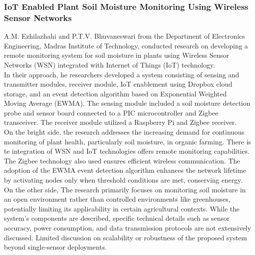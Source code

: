 \documentclass[12pt, a4paper]{article}
\begin{document}
\subsubsection{IoT Enabled Plant Soil Moisture Monitoring Using Wireless Sensor Networks}
A.M. Ezhilazhahi and P.T.V. Bhuvaneswari \cite{ezhilazhahi2017iot} from the Department of Electronics Engineering, Madras Institute of Technology, conducted research on developing a remote monitoring system for soil moisture in plants using Wireless Sensor Networks (WSN) integrated with Internet of Things (IoT) technology.\\
In their approach, he researchers developed a system consisting of sensing and transmitter modules,
receiver module, IoT enablement using Dropbox cloud storage, and an event detection algorithm based on Exponential Weighted Moving Average (EWMA). The sensing module included a soil moisture detection probe and sensor board connected to a PIC microcontroller and Zigbee transceiver. The receiver module utilized a Raspberry Pi and Zigbee receiver.\\
On the bright side, the research addresses the increasing demand for continuous monitoring of plant health, particularly soil moisture, in organic farming. There is te integration of WSN and IoT technologies offers remote monitoring capabilities. The Zigbee technology also  used ensures efficient wireless communication. The adoption of the EWMA event detection algorithm enhances the network lifetime by activating nodes only when threshold conditions are met, conserving energy.\\
On the other side, The research primarily focuses on monitoring soil moisture in an open environment rather than controlled environments like greenhouses, potentially limiting its applicability in certain
agricultural contexts. While the system's components are described, specific technical details such as sensor accuracy, power consumption, and data transmission protocols are not extensively discussed. Limited discussion on scalability or robustness of the proposed system beyond single-sensor deployments.
\end{document}
